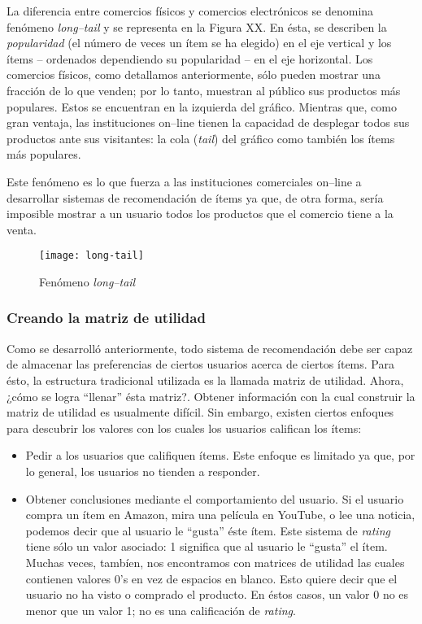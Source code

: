 			La diferencia entre comercios físicos y comercios electrónicos se denomina fenómeno \textit{long--tail} y se representa en la Figura XX. En ésta, se describen la \textit{popularidad} (el número de veces un ítem se ha elegido) en el eje vertical y los ítems -- ordenados dependiendo su popularidad -- en el eje horizontal. Los comercios físicos, como detallamos anteriormente, sólo pueden mostrar una fracción de lo que venden; por lo tanto, muestran al público sus productos más populares. Estos se encuentran en la izquierda del gráfico. Mientras que, como gran ventaja, las instituciones on--line tienen la capacidad de desplegar todos sus productos ante sus visitantes: la cola (\textit{tail}) del gráfico como también los ítems más populares. \par
			
			Este fenómeno es lo que fuerza a las instituciones comerciales on--line a desarrollar sistemas de recomendación de ítems ya que, de otra forma, sería imposible mostrar a un usuario todos los productos que el comercio tiene a la venta.
			
			\begin{figure}[h]
				\texttt{[image: long-tail]}
				\centering
				\caption{Fenómeno \textit{long--tail}}
			\end{figure}
			
		\subsubsection{Creando la matriz de utilidad}
			Como se desarrolló anteriormente, todo sistema de recomendación debe ser capaz de almacenar las preferencias de ciertos usuarios acerca de ciertos ítems. Para ésto, la estructura tradicional utilizada es la llamada matriz de utilidad. Ahora, ¿cómo se logra \enquote{llenar} ésta matriz?. Obtener información con la cual construir la matriz de utilidad es usualmente difícil. Sin embargo, existen ciertos enfoques para descubrir los valores con los cuales los usuarios califican los ítems:
			\begin{itemize}
				\item Pedir a los usuarios que califiquen ítems. Este enfoque es limitado ya que, por lo general, los usuarios no tienden a responder.
				\item Obtener conclusiones mediante el comportamiento del usuario. Si el usuario compra un ítem en Amazon, mira una película en YouTube, o lee una noticia, podemos decir que al usuario le \enquote{gusta} éste ítem. Este sistema de \textit{rating} tiene sólo un valor asociado: 1 significa que al usuario le \enquote{gusta} el ítem. Muchas veces, tambíen, nos encontramos con matrices de utilidad las cuales contienen valores 0's en vez de espacios en blanco. Esto quiere decir que el usuario no ha visto o comprado el producto. En éstos casos, un valor 0 no es menor que un valor 1; no es una calificación de \textit{rating}.
			\end{itemize}
			
